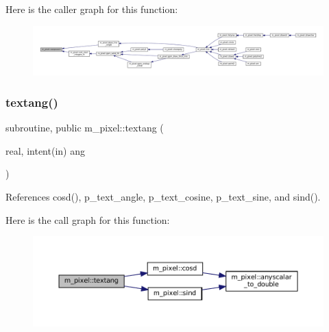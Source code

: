 Here is the caller graph for this function\+:
\nopagebreak
\begin{figure}[H]
\begin{center}
\leavevmode
\includegraphics[width=350pt]{namespacem__pixel_a063f74c3dd2f7f086dc47ec68abc22c9_icgraph}
\end{center}
\end{figure}
\mbox{\label{namespacem__pixel_a5e213461e9894b99c9e8f278d5c4a858}} 
\subsubsection{\texorpdfstring{textang()}{textang()}}
{\footnotesize\ttfamily subroutine, public m\+\_\+pixel\+::textang (\begin{DoxyParamCaption}\item[{real, intent(in)}]{ang }\end{DoxyParamCaption})}



References cosd(), p\+\_\+text\+\_\+angle, p\+\_\+text\+\_\+cosine, p\+\_\+text\+\_\+sine, and sind().

Here is the call graph for this function\+:
\nopagebreak
\begin{figure}[H]
\begin{center}
\leavevmode
\includegraphics[width=350pt]{namespacem__pixel_a5e213461e9894b99c9e8f278d5c4a858_cgraph}
\end{center}
\end{figure}
\mbox{\label{namespacem__pixel_a070e9fff1f2cd0c89d40c5d3c72b7f2c}} 
